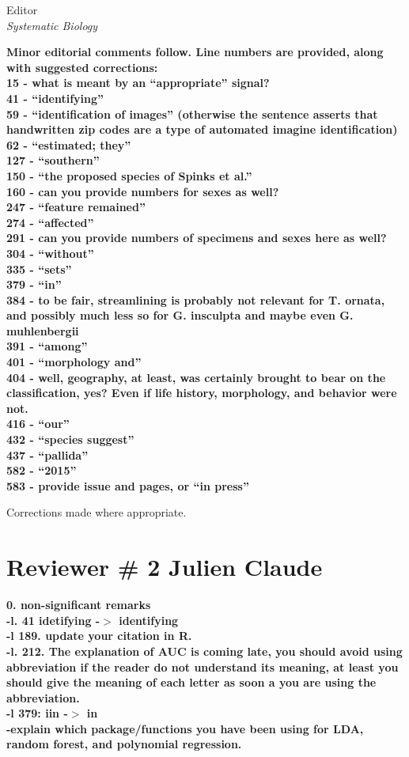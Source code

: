 \documentclass{letter}
\begin{document}
\begin{letter}{Editor \\ \textit{Systematic Biology}}

  \textbf{Minor editorial comments follow. Line numbers are provided, along with suggested corrections: \\
    15 - what is meant by an ``appropriate'' signal? \\
    41 - ``identifying'' \\
    59 - ``identification of images'' (otherwise the sentence asserts that handwritten zip codes are a type of automated imagine identification) \\
    62 - ``estimated; they'' \\
    127 - ``southern'' \\
    150 - ``the proposed species of Spinks et al.'' \\
    160 - can you provide numbers for sexes as well? \\
    247 - ``feature remained'' \\
    274 - ``affected'' \\
    291 - can you provide numbers of specimens and sexes here as well? \\
    304 - ``without'' \\
    335 - ``sets'' \\
    379 - ``in'' \\
    384 - to be fair, streamlining is probably not relevant for T. ornata, and possibly much less so for G. insculpta and maybe even G. muhlenbergii \\
    391 - ``among'' \\
    401 - ``morphology and'' \\
    404 - well, geography, at least, was certainly brought to bear on the classification, yes? Even if life history, morphology, and behavior were not. \\
    416 - ``our'' \\
    432 - ``species suggest'' \\
    437 - ``pallida'' \\
    582 - ``2015'' \\
  583 - provide issue and pages, or ``in press'' }

  Corrections made where appropriate.



  \section{Reviewer \# 2 Julien Claude}

  \textbf{0. non-significant remarks \\
    -l. 41 idetifying -\(>\) identifying \\
    -l 189. update your citation in R. \\
    -l. 212. The explanation of AUC is coming late, you should avoid using abbreviation if the reader do not understand its meaning, at least you should give the meaning of each letter as soon a you are using the abbreviation. \\
    -l 379: iin -\(>\) in \\
  -explain which package/functions you have been using for LDA, random forest, and polynomial regression.}


\end{letter}
\end{document}
